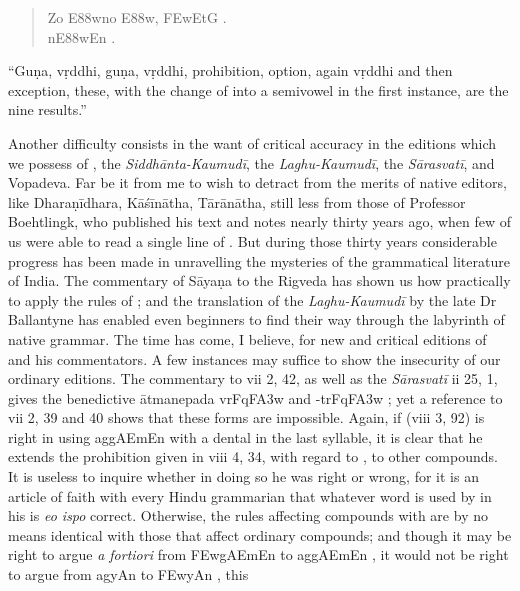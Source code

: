 \begin{quote}
  {\dn {}Zo E\388wno E\388w, \3FEwEtG\? .} \\
  {\dn {}n\0E\388wEn\0 .}
\end{quote}

``Guṇa, vṛddhi, guṇa, vṛddhi, prohibition, option, again vṛddhi and then
exception, these, with the change of  into a semivowel in the
first instance, are the nine results.''

Another difficulty consists in the want of critical accuracy in the
editions which we possess of \panini{}, the \emph{Siddhānta-Kaumudī},
the \emph{Laghu-Kaumudī}, the \emph{Sārasvatī}, and Vopadeva. Far
be it from me to wish to detract from the merits of native editors, like
Dharaṇīdhara, Kāśīnātha, Tārānātha, still less from those of Professor
Boehtlingk, who published his text and notes nearly thirty years ago,
when few of us were able to read a single line of \panini{}. But during
those thirty years considerable progress has been made in unravelling
the mysteries of the grammatical literature of India. The commentary of
Sāyaṇa to the Rigveda has shown us how practically to apply the rules of
\panini{}; and the translation of the \emph{Laghu-Kaumudī} by the late
Dr Ballantyne has enabled even beginners to find their way through the
labyrinth of native grammar. The time has come, I believe, for new and
critical editions of \panini{} and his commentators. A few instances may
suffice to show the insecurity of our ordinary editions. The commentary
to \panini{} vii 2, 42, as well as the \emph{Sārasvatī} ii 25, 1, gives
the benedictive ātmanepada {\dn vrFqF\3A3w}  and
{\dn -trFqF\3A3w} ; yet a reference to \panini{} vii 2,
39 and 40 shows that these forms are impossible. Again, if \panini{}
(viii 3, 92) is right in using {\dn ag\5gAEmEn}  with a
dental  in the last syllable, it is clear that he extends the
prohibition given in viii 4, 34, with regard to , to other
compounds. It is useless to inquire whether in doing so he was right or
wrong, for it is an article of faith with every Hindu grammarian that
whatever word is used by \panini{} in his  is \emph{eo ispo}
correct. Otherwise, the rules affecting compounds with 
are by no means identical with those that affect ordinary compounds; and
though it may be right to argue \emph{a fortiori} from {\dn \3FEwgAEmEn}
 to {\dn ag\5gAEmEn} , it would not be right
to argue from {\dn ag\5yAn}  to {\dn \3FEwyAn} , this
